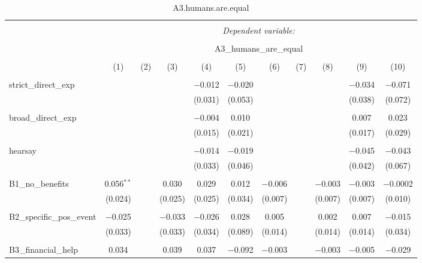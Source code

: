 
\begin{table}[H] \centering 
  \caption{A3.humans.are.equal} 
  \label{} 
\tiny 
\begin{tabular}{@{\extracolsep{4pt}}lcccccccccc} 
\\[-1.8ex]\hline 
\hline \\[-1.8ex] 
 & \multicolumn{10}{c}{\textit{Dependent variable:}} \\ 
\cline{2-11} 
\\[-1.8ex] & \multicolumn{10}{c}{A3\_humans\_are\_equal} \\ 
\\[-1.8ex] & (1) & (2) & (3) & (4) & (5) & (6) & (7) & (8) & (9) & (10)\\ 
\hline \\[-1.8ex] 
 strict\_direct\_exp &  &  &  & $-$0.012 & $-$0.020 &  &  &  & $-$0.034 & $-$0.071 \\ 
  &  &  &  & (0.031) & (0.053) &  &  &  & (0.038) & (0.072) \\ 
  & & & & & & & & & & \\ 
 broad\_direct\_exp &  &  &  & $-$0.004 & 0.010 &  &  &  & 0.007 & 0.023 \\ 
  &  &  &  & (0.015) & (0.021) &  &  &  & (0.017) & (0.029) \\ 
  & & & & & & & & & & \\ 
 hearsay &  &  &  & $-$0.014 & $-$0.019 &  &  &  & $-$0.045 & $-$0.043 \\ 
  &  &  &  & (0.033) & (0.046) &  &  &  & (0.042) & (0.067) \\ 
  & & & & & & & & & & \\ 
 B1\_no\_benefits & 0.056$^{**}$ &  & 0.030 & 0.029 & 0.012 & $-$0.006 &  & $-$0.003 & $-$0.003 & $-$0.0002 \\ 
  & (0.024) &  & (0.025) & (0.025) & (0.034) & (0.007) &  & (0.007) & (0.007) & (0.010) \\ 
  & & & & & & & & & & \\ 
 B2\_specific\_pos\_event & $-$0.025 &  & $-$0.033 & $-$0.026 & 0.028 & 0.005 &  & 0.002 & 0.007 & $-$0.015 \\ 
  & (0.033) &  & (0.033) & (0.034) & (0.089) & (0.014) &  & (0.014) & (0.014) & (0.034) \\ 
  & & & & & & & & & & \\ 
 B3\_financial\_help & 0.034 &  & 0.039 & 0.037 & $-$0.092 & $-$0.003 &  & $-$0.003 & $-$0.005 & $-$0.029 \\ 

\end{tabular}
\end{table}
